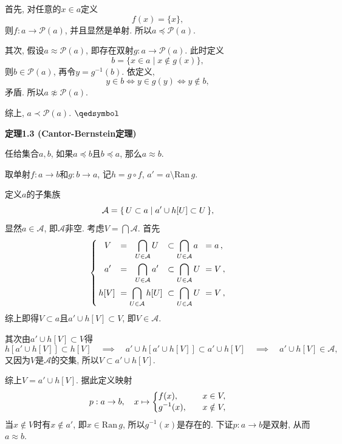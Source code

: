 首先, 对任意的$x\in a$定义
\[
    f(x)=\{x\},
\]
则$f:a\to\mathcal{P}(a)$, 并且显然是单射. 所以$a\preccurlyeq\mathcal{P}(a)$.

其次, 假设$a\approx\mathcal{P}(a)$, 即存在双射$g:a\to\mathcal{P}(a)$. 此时定义
\[
    b=\{x\in a\mid x\notin g(x)\},
\]
则$b\in\mathcal{P}(a)$, 再令$y=g^{-1}(b)$. 依定义,
\[
    y\in b\iff y\in g(y)\iff y\notin b,
\]
矛盾. 所以$a\not\approx\mathcal{P}(a)$.

综上, $a\prec\mathcal{P}(a)$. \hfill $\qedsymbol$





\newpage

\hypertarget{sec:定理1.3}{}
\noindent\textbf{定理1.3 (Cantor-Bernstein定理)}

任给集合$a,b$, 如果$a\preccurlyeq b$且$b\preccurlyeq a$, 那么$a\approx b$.


取单射$f:a\to b$和$g:b\to a$, 记$h=g\circ f$, $a'=a\setminus\mathrm{Ran}\,g$.

定义$a$的子集族
\vspace{-3pt}
\[
    \mathcal{A}=\{\,U\subset a\mid a'\cup h[U]\subset U\,\},\\[-3pt]
\]
显然$a\in\mathcal{A}$, 即$\mathcal{A}$非空.
考虑$\displaystyle V=\bigcap\mathcal{A}$. 首先
\vspace{3pt}
\[\left\{\begin{aligned}
    \,&\,\,\,\,V\!\!\!\!&&=\,\,\,\,\bigcap_{U\in\mathcal{A}}U\!\!\!\!&&
    \subset\bigcap_{U\in\mathcal{A}}a\!\!\!\!&&=a\,,\\
    \,&\,\,\,\,a'\!\!\!\!&&=\,\,\,\,\bigcap_{U\in\mathcal{A}}a'\!\!\!\!&&
    \subset\bigcap_{U\in\mathcal{A}}U\!\!\!\!&&=V\,,\\
    \,&h[V]\!\!\!\!&&=\bigcap_{U\in\mathcal{A}}h[U]\!\!\!\!&&
    \subset\bigcap_{U\in\mathcal{A}}U\!\!\!\!&&=V\,,
\end{aligned}\right.\\[3pt]\]
综上即得$V\subset a$且$a'\cup h[V]\subset V$, 即$V\in\mathcal{A}$.

\vspace{3pt}
其次由$a'\cup h[V]\subset V$得
\[
    h[a'\cup h[V]]\subset h[V]\quad\implies\quad
    a'\cup h[a'\cup h[V]]\subset a'\cup h[V]\quad\implies\quad
    a'\cup h[V]\in\mathcal{A},
\]
又因为$V$是$\mathcal{A}$的交集, 所以$V\subset a'\cup h[V]$.

\vspace{3pt}
综上$V=a'\cup h[V]$. 据此定义映射
\vspace{-3pt}
\[p:a\to b,\quad x\mapsto\left\{\begin{aligned}
    &f(x),\quad&&x\in V,\\[-3pt]
    &g^{-1}(x),\quad&&x\notin V,
\end{aligned}\right.\\[3pt]\]
当$x\notin V$时有$x\notin a'$, 即$x\in\mathrm{Ran}\,g$, 所以$g^{-1}(x)$是存在的.
下证$p:a\to b$是双射, 从而$a\approx b$.

